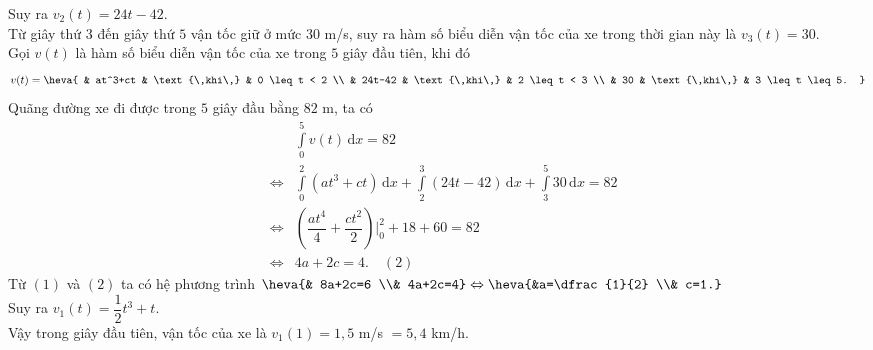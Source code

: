 \begin{ex}
{Suy ra $v_{2}(t)=24t-42$.\\
Từ giây thứ $3$ đến giây thứ $5$ vận tốc giữ ở mức $30$ m/s, suy ra hàm số biểu diễn vận tốc của xe trong thời gian này là $v_{3}(t)=30$.\\
Gọi $v(t)$ là hàm số biểu diễn vận tốc của xe trong $5$ giây đầu tiên, khi đó
\[ v(t)=\heva{
& at^3+ct & \text{\,khi\,} & 0 \leq t < 2 \\
& 24t-42 & \text{\,khi\,} & 2 \leq t < 3 \\
& 30 & \text{\,khi\,} & 3 \leq t \leq 5.
} \]
Quãng đường xe đi được trong $5$ giây đầu bằng $82$ m, ta có
\begin{eqnarray*}
&& \displaystyle\int\limits_0^5 v(t) \mathrm{\,d}x= 82 \\
&\Leftrightarrow& \displaystyle\int\limits_0^2 (at^3+ct) \mathrm{\,d}x + \displaystyle\int\limits_2^3 (24t-42) \mathrm{\,d}x + \displaystyle\int\limits_3^5 30 \mathrm{\,d}x = 82 \\
&\Leftrightarrow& \left(\dfrac{at^4}{4}+\dfrac{ct^2}{2}\right)\Bigg|_0^2 + 18 + 60 = 82 \\
&\Leftrightarrow& 4a+2c=4. \quad(2)
\end{eqnarray*}
Từ $(1)$ và $(2)$ ta có hệ phương trình $\heva{& 8a+2c=6 \\& 4a+2c=4} \Leftrightarrow \heva{&a=\dfrac{1}{2} \\& c=1.}$\\
Suy ra $v_{1}(t)=\dfrac{1}{2}t^3+t$.\\
Vậy trong giây đầu tiên, vận tốc của xe là $v_{1}(1)=1{,}5$ m/s $=5{,}4$ km/h.
}
\end{ex}

